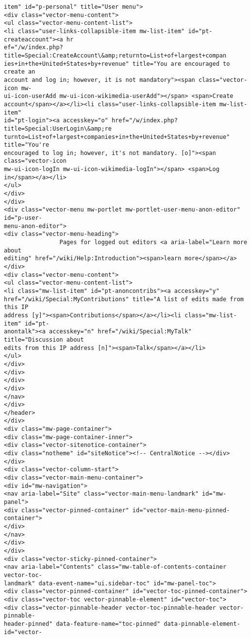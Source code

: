 \documentclass[11pt]{article}
\begin{document}
\begin{Verbatim}[commandchars=\\\{\}]
item" id="p-personal" title="User menu">
<div class="vector-menu-content">
<ul class="vector-menu-content-list">
<li class="user-links-collapsible-item mw-list-item" id="pt-createaccount"><a hr
ef="/w/index.php?title=Special:CreateAccount\&amp;returnto=List+of+largest+compan
ies+in+the+United+States+by+revenue" title="You are encouraged to create an
account and log in; however, it is not mandatory"><span class="vector-icon mw-
ui-icon-userAdd mw-ui-icon-wikimedia-userAdd"></span> <span>Create
account</span></a></li><li class="user-links-collapsible-item mw-list-item"
id="pt-login"><a accesskey="o" href="/w/index.php?title=Special:UserLogin\&amp;re
turnto=List+of+largest+companies+in+the+United+States+by+revenue" title="You're
encouraged to log in; however, it's not mandatory. [o]"><span class="vector-icon
mw-ui-icon-logIn mw-ui-icon-wikimedia-logIn"></span> <span>Log
in</span></a></li>
</ul>
</div>
</div>
<div class="vector-menu mw-portlet mw-portlet-user-menu-anon-editor" id="p-user-
menu-anon-editor">
<div class="vector-menu-heading">
                Pages for logged out editors <a aria-label="Learn more about
editing" href="/wiki/Help:Introduction"><span>learn more</span></a>
</div>
<div class="vector-menu-content">
<ul class="vector-menu-content-list">
<li class="mw-list-item" id="pt-anoncontribs"><a accesskey="y"
href="/wiki/Special:MyContributions" title="A list of edits made from this IP
address [y]"><span>Contributions</span></a></li><li class="mw-list-item" id="pt-
anontalk"><a accesskey="n" href="/wiki/Special:MyTalk" title="Discussion about
edits from this IP address [n]"><span>Talk</span></a></li>
</ul>
</div>
</div>
</div>
</div>
</nav>
</div>
</header>
</div>
<div class="mw-page-container">
<div class="mw-page-container-inner">
<div class="vector-sitenotice-container">
<div class="notheme" id="siteNotice"><!-- CentralNotice --></div>
</div>
<div class="vector-column-start">
<div class="vector-main-menu-container">
<div id="mw-navigation">
<nav aria-label="Site" class="vector-main-menu-landmark" id="mw-panel">
<div class="vector-pinned-container" id="vector-main-menu-pinned-container">
</div>
</nav>
</div>
</div>
<div class="vector-sticky-pinned-container">
<nav aria-label="Contents" class="mw-table-of-contents-container vector-toc-
landmark" data-event-name="ui.sidebar-toc" id="mw-panel-toc">
<div class="vector-pinned-container" id="vector-toc-pinned-container">
<div class="vector-toc vector-pinnable-element" id="vector-toc">
<div class="vector-pinnable-header vector-toc-pinnable-header vector-pinnable-
header-pinned" data-feature-name="toc-pinned" data-pinnable-element-id="vector-

\end{Verbatim}
\end{document}
